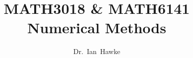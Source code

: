 \documentclass[a4paper,12pt]{report}
\begin{document}

\title{MATH3018 \& MATH6141 \\ Numerical Methods }
\author{Dr.~Ian~Hawke}
\date{}

\maketitle


\begin{titlepage}
\newpage
\mbox{}
\end{titlepage}

\tableofcontents















\appendix

\end{document}
